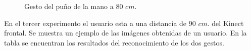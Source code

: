 \begin{figure}[h!]
\caption{Gesto del puño de la mano a $80$ $cm$.} \label{fig:G2I80}
\end{figure}


En el tercer experimento el usuario esta a una distancia de $90$ $cm.$ del Kinect frontal. Se muestra un ejemplo de las imágenes obtenidas de un usuario. En la tabla se encuentran los resultados del reconocimiento de los dos gestos.    

